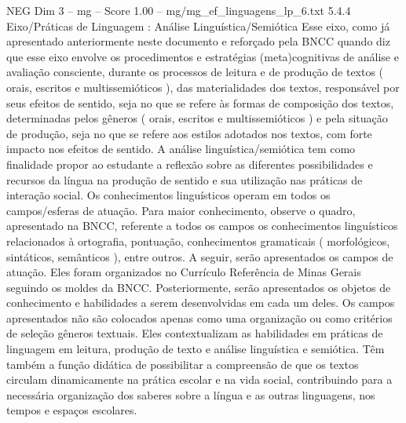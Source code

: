 \begin{textsample}{NEG Dim 3 – mg – Score 1.00 – mg/mg\_ef\_linguagens\_lp\_6.txt}  \label{ex:f3_neg_029}
5.4.4 Eixo/Práticas de Linguagem : Análise Linguística/Semiótica Esse eixo, como já apresentado anteriormente neste documento e reforçado pela BNCC quando diz que esse eixo envolve os procedimentos e estratégias (meta)cognitivas de análise e avaliação consciente, durante os processos de leitura e de produção de textos ( orais, escritos e multissemióticos ), das materialidades dos textos, responsável por seus efeitos de sentido, seja no que se refere às formas de composição dos textos, determinadas pelos gêneros ( orais, escritos e multissemióticos ) e pela situação de produção, seja no que se refere aos estilos adotados nos textos, com forte impacto nos efeitos de sentido.
A análise linguística/semiótica tem como finalidade propor ao estudante a reflexão sobre as diferentes possibilidades e recursos da língua na produção de sentido e sua utilização nas práticas de interação social.
Os conhecimentos linguísticos operam em todos os campos/esferas de atuação.
Para maior conhecimento, observe o quadro, apresentado na BNCC, referente a todos os campos os conhecimentos linguísticos relacionados à ortografia, pontuação, conhecimentos gramaticais ( morfológicos, sintáticos, semânticos ), entre outros.
A seguir, serão apresentados os campos de atuação.
Eles foram organizados no Currículo Referência de Minas Gerais seguindo os moldes da BNCC.
Posteriormente, serão apresentados os objetos de conhecimento e habilidades a serem desenvolvidas em cada um deles.
Os campos apresentados não são colocados apenas como uma organização ou como critérios de seleção gêneros textuais.
Eles contextualizam as habilidades em práticas de linguagem em leitura, produção de texto e análise linguística e semiótica.
Têm também a função didática de possibilitar a compreensão de que os textos circulam dinamicamente na prática escolar e na vida social, contribuindo para a necessária organização dos saberes sobre a língua e as outras linguagens, nos tempos e espaços escolares.

\end{textsample}
